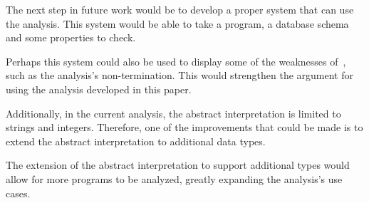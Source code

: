 The next step in future work would be to develop a proper system that can use the analysis.
This system would be able to take a program, a database schema and some properties to check.

Perhaps this system could also be used to display some of the weaknesses of~\cite{halder_abstract_2012}, such as the analysis's non-termination.
This would strengthen the argument for using the analysis developed in this paper.

Additionally, in the current analysis, the abstract interpretation is limited to strings and integers.
Therefore, one of the improvements that could be made is to extend the abstract interpretation to additional data types.

The extension of the abstract interpretation to support additional types would allow for more programs to be analyzed, greatly expanding the analysis's use cases.







